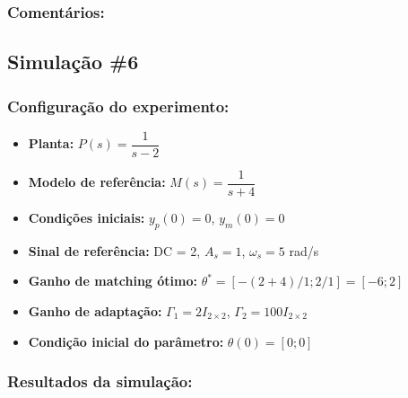 \documentclass[10pt]{article}
\begin{document}
\subsubsection{Comentários:}

\newpage

\subsection{Simulação \#6}
\subsubsection{Configuração do experimento:}
\begin{itemize}
\item \textbf{Planta:} $P(s) = \dfrac{1}{s - 2}$
\item \textbf{Modelo de referência:} $M(s) = \dfrac{1}{s + 4}$
\item \textbf{Condições iniciais:} $y_p(0)=0$, $y_m(0)=0$
\item \textbf{Sinal de referência:} DC = 2, $A_s=1$, $\omega_s=5$ rad/s
\item \textbf{Ganho de matching ótimo:} $\theta^* = [-(2+4)/1;2/1] = [-6;2]$
\item \textbf{Ganho de adaptação:} $\Gamma_1 = 2I_{2\times2}$, $\Gamma_2 = 100I_{2\times2}$
\item \textbf{Condição inicial do parâmetro:} $\theta(0) = [0;0]$
\end{itemize}

\subsubsection{Resultados da simulação:}
\end{document}
